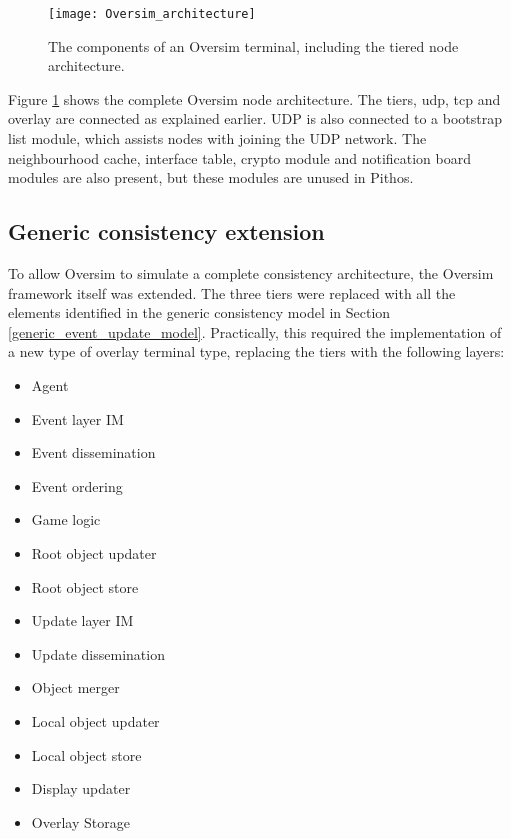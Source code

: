 \begin{figure}[htbp]
 \centering
 \texttt{[image: Oversim\_architecture]}
 \caption{The components of an Oversim terminal, including the tiered node architecture.}
 \label{fig_oversim_architecture}
\end{figure}

Figure \ref{fig_oversim_architecture} shows the complete Oversim node architecture. The tiers, udp, tcp and overlay are connected as explained earlier. UDP is also connected to a bootstrap list module, which assists nodes with joining the UDP network. The neighbourhood cache, interface table, crypto module and notification board modules are also present, but these modules are unused in Pithos.

    \subsection{Generic consistency extension}


To allow Oversim to simulate a complete consistency architecture, the Oversim framework itself was extended. The three tiers were replaced with all the elements identified in the generic consistency model in Section \ref{generic_event_update_model}. Practically, this required the implementation of a new type of overlay terminal type, replacing the tiers with the following layers:
%
\begin{itemize}
    \item Agent
    \item Event layer IM
    \item Event dissemination
    \item Event ordering
    \item Game logic
    \item Root object updater
    \item Root object store
    \item Update layer IM
    \item Update dissemination
    \item Object merger
    \item Local object updater
    \item Local object store
    \item Display updater
    \item Overlay Storage
\end{itemize}

